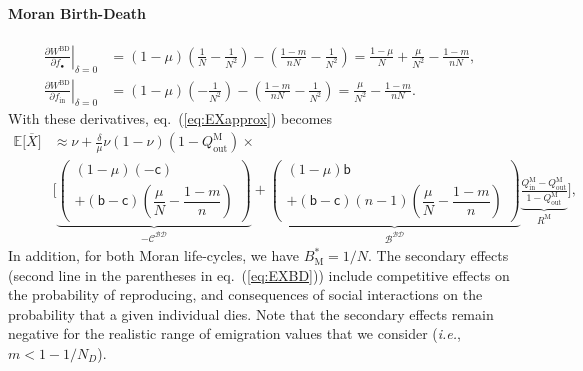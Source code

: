\documentclass[11pt, letterpaper]{article}
\renewcommand{\eqref}[1]{\textup{{\normalfont eq.~(\ref{#1}}\normalfont)}}
\newcommand{\ie}{\textit{i.e.}}
\newcommand{\deriv}[2]{\partial_{#2}\!{#1}\,}
\newcommand{\derivv}[3]{\left.\frac{\partial #1}{\partial #2}\right |_{#3=0}} %
\newcommand{\Esp}[1]{\mathbb{E}\big[ #1\big]}%
\newcommand{\bb}{\mathsf{b}}
\newcommand{\cc}{\mathsf{c}}
\newcommand{\Moran}{\textrm{M}}
\newcommand{\BD}{\textrm{BD}}
\newcommand{\mutbias}{\nu}
\newcommand{\inn}{\textrm{in}}
\newcommand{\out}{\textrm{out}}
\newcommand{\focal}{\bullet}
\newcommand{\ndemes}{N_D}
\newcommand{\selstr}{\delta}
\begin{document}
\paragraph{Moran Birth-Death}
\begin{subequations}\label{eq:dWBD}
\begin{align}
\derivv{W^{\BD}}{f_{\focal}}{\selstr} &= (1-\mu) \left(\frac{1}{N} - \frac{1}{N^2}\right) - \left( \frac{1-m}{n N} - \frac{1}{N^2} \right) = \frac{1-\mu}{N} + \frac{\mu}{N^2} - \frac{1-m}{n N}, \\
\derivv{W^{\BD}}{f_{\inn}}{\selstr} &= (1-\mu) \left(- \frac{1}{N^2}\right) - \left( \frac{1-m}{n N} - \frac{1}{N^2} \right) = \frac{\mu}{N^2} - \frac{1-m}{n N}.
\end{align}
\end{subequations}
%
With these derivatives, \eqref{eq:EXapprox} becomes
%
\begin{equation}\label{eq:EXBD}
\begin{split}
\Esp{\overline{X}} & \approx \mutbias + 
\frac{\selstr}{\mu}  \mutbias (1-\mutbias) (1 - Q_{\out}^{\Moran}) \times \\
 &\Bigg[ \underbrace{ \begin{pmatrix}
 (1-\mu) (-\cc) \\
 + (\bb - \cc) \left( \dfrac{\mu}{N} - \dfrac{1-m}{n} \right) 
 \end{pmatrix}
}_{-\mathcal{C^{\BD}}} + \underbrace{ \begin{pmatrix}
(1-\mu) \bb \\
+ (\bb - \cc) (n-1) \left(  \dfrac{\mu}{N} - \dfrac{1-m}{n} \right) 
\end{pmatrix}
}_{\mathcal{B^{\BD}}} \underbrace{\frac{Q_{\inn}^{\Moran} - Q_{\out}^{\Moran}}{1 - Q_{\out}^{\Moran}}}_{R^{\Moran}} \Bigg],
\end{split}
\end{equation}
%
In addition, for both Moran life-cycles, we have $B^{*}_\Moran = 1/N$. 
The secondary effects (second line in the parentheses in \eqref{eq:EXBD}) include competitive effects on the probability of reproducing, and consequences of social interactions on the probability that a given individual dies. Note that the secondary effects remain negative for the realistic range of emigration values that we consider (\ie, $m<1 - 1/\ndemes$).
\end{document}
